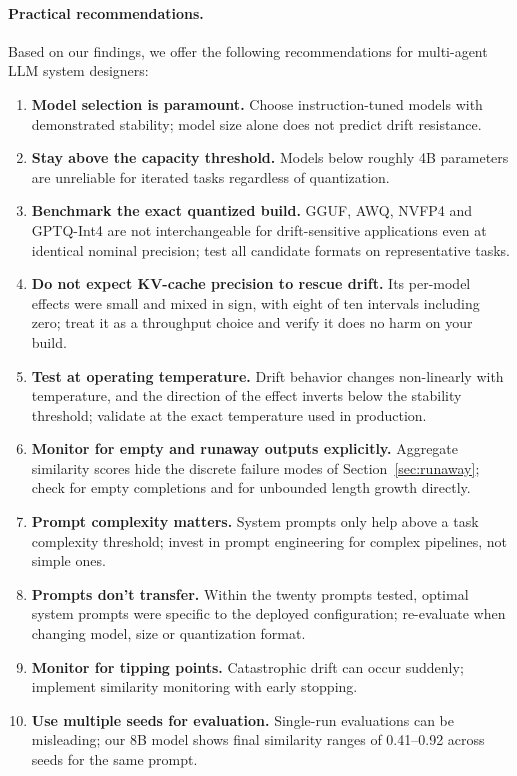 \documentclass[11pt]{article}
\begin{document}
\paragraph{Practical recommendations.}
Based on our findings, we offer the following recommendations for multi-agent
LLM system designers:
\begin{enumerate}[leftmargin=*]
  \item \textbf{Model selection is paramount.} Choose instruction-tuned models
        with demonstrated stability; model size alone does not predict drift
        resistance.
  \item \textbf{Stay above the capacity threshold.} Models below roughly 4B
        parameters are unreliable for iterated tasks regardless of
        quantization.
  \item \textbf{Benchmark the exact quantized build.} GGUF, AWQ, NVFP4 and
        GPTQ-Int4 are not interchangeable for drift-sensitive applications
        even at identical nominal precision; test all candidate formats on
        representative tasks.
  \item \textbf{Do not expect KV-cache precision to rescue drift.} Its
        per-model effects were small and mixed in sign, with eight of ten
        intervals including zero; treat it as a throughput choice and verify
        it does no harm on your build.
  \item \textbf{Test at operating temperature.} Drift behavior changes
        non-linearly with temperature, and the direction of the effect inverts
        below the stability threshold; validate at the exact temperature used
        in production.
  \item \textbf{Monitor for empty and runaway outputs explicitly.} Aggregate
        similarity scores hide the discrete failure modes of
        Section~\ref{sec:runaway}; check for empty completions and for
        unbounded length growth directly.
  \item \textbf{Prompt complexity matters.} System prompts only help above a
        task complexity threshold; invest in prompt engineering for complex
        pipelines, not simple ones.
  \item \textbf{Prompts don't transfer.} Within the twenty prompts tested,
        optimal system prompts were specific to the deployed configuration;
        re-evaluate when changing model, size or quantization format.
  \item \textbf{Monitor for tipping points.} Catastrophic drift can occur
        suddenly; implement similarity monitoring with early stopping.
  \item \textbf{Use multiple seeds for evaluation.} Single-run evaluations
        can be misleading; our 8B model shows final similarity ranges of
        0.41--0.92 across seeds for the same prompt.
\end{enumerate}
\end{document}
